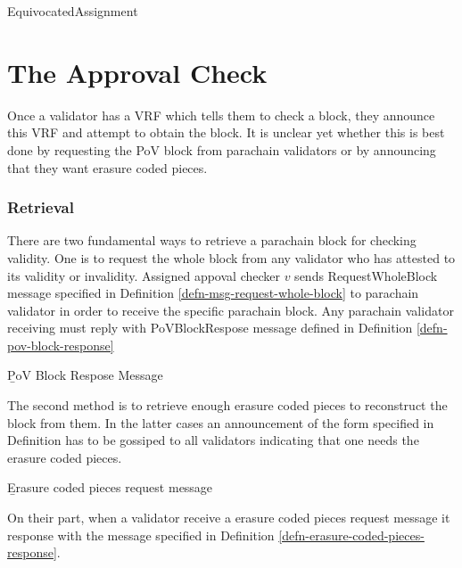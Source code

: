 {{\begin{algorithm}
  \caption[]{\sc EquivocatedAssignment}
  \label{algo-equivocation-assigment}
  \begin{algorithmic}[1]
    \Require{}
    
    \State \TBS
  \end{algorithmic}
\end{algorithm}


\section{The Approval Check}
Once a validator has a VRF which tells them to check a block, they announce this VRF and attempt to obtain the block. 
It is unclear yet whether this is best done by requesting the PoV block from parachain validators or by announcing that they want erasure coded pieces. 

\subsubsection{Retrieval}
\label{sect-retrieval-of-erasure-pieces}
There are two fundamental ways to retrieve a parachain block for checking validity. One is to request the whole block from any validator who has attested to its validity or invalidity. Assigned appoval checker $v$ sends RequestWholeBlock message specified in Definition \ref{defn-msg-request-whole-block} to  parachain validator in order to receive the specific parachain block. Any parachain validator receiving must reply with PoVBlockRespose message defined in Definition \ref{defn-pov-block-response}

\begin{definition}
  \label{defn-pov-block-response}
        {\b PoV Block Respose} Message \TBS
\end{definition}

The second method is to retrieve enough erasure coded pieces to reconstruct the block from them. In the latter cases an announcement of the form specified in Definition has to be gossiped to all validators indicating that one needs the erasure coded pieces.

\begin{definition}
  \label{defn-erasure-coded-pieces-request}
        {\b Erasure coded pieces request message} \TBS
\end{definition}

On their part, when a validator  receive a erasure coded pieces request message it response with the message specified in Definition \ref{defn-erasure-coded-pieces-response}.

}}
